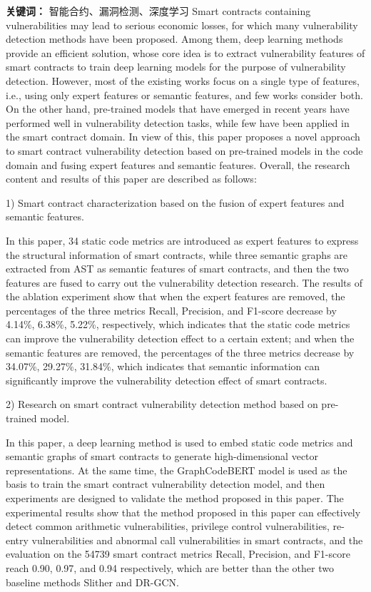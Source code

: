     {\noindent \textbf{关键词：} 智能合约、漏洞检测、深度学习}
\cleardoublepage
{}
Smart contracts containing vulnerabilities may lead to serious economic losses, for which many vulnerability detection methods have been proposed. Among them, deep learning methods provide an efficient solution, whose core idea is to extract vulnerability features of smart contracts to train deep learning models for the purpose of vulnerability detection. However, most of the existing works focus on a single type of features, i.e., using only expert features or semantic features, and few works consider both. On the other hand, pre-trained models that have emerged in recent years have performed well in vulnerability detection tasks, while few have been applied in the smart contract domain. In view of this, this paper proposes a novel approach to smart contract vulnerability detection based on pre-trained models in the code domain and fusing expert features and semantic features. Overall, the research content and results of this paper are described as follows:

    1) Smart contract characterization based on the fusion of expert features and semantic features.

    In this paper, 34 static code metrics are introduced as expert features to express the structural information of smart contracts, while three semantic graphs are extracted from AST as semantic features of smart contracts, and then the two features are fused to carry out the vulnerability detection research. The results of the ablation experiment show that when the expert features are removed, the percentages of the three metrics Recall, Precision, and F1-score decrease by 4.14\%, 6.38\%, 5.22\%, respectively, which indicates that the static code metrics can improve the vulnerability detection effect to a certain extent; and when the semantic features are removed, the percentages of the three metrics decrease by 34.07\%, 29.27\%, 31.84\%, which indicates that semantic information can significantly improve the vulnerability detection effect of smart contracts.

    2) Research on smart contract vulnerability detection method based on pre-trained model.
    
    In this paper, a deep learning method is used to embed static code metrics and semantic graphs of smart contracts to generate high-dimensional vector representations. At the same time, the GraphCodeBERT model is used as the basis to train the smart contract vulnerability detection model, and then experiments are designed to validate the method proposed in this paper. The experimental results show that the method proposed in this paper can effectively detect common arithmetic vulnerabilities, privilege control vulnerabilities, re-entry vulnerabilities and abnormal call vulnerabilities in smart contracts, and the evaluation on the \num{54739} smart contract metrics Recall, Precision, and F1-score reach 0.90, 0.97, and 0.94 respectively, which are better than the other two baseline methods Slither and DR-GCN.
    
